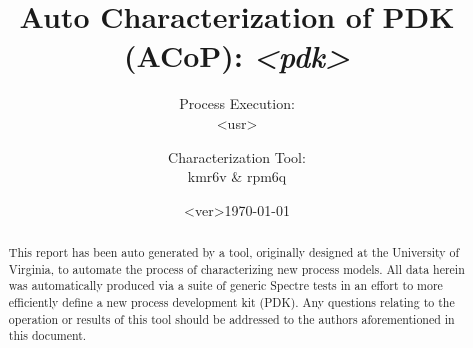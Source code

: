 \documentclass[letterpaper]{article}
\title{Auto Characterization of PDK (ACoP): \emph{<pdk>}}
\author{Process Execution: \\<usr> \and Characterization Tool: \\kmr6v \& rpm6q}
\date{<ver>\today}
\begin{document}


\maketitle
\begin{abstract}
This report has been auto generated by a tool, originally designed at the University of Virginia, to automate the process of characterizing new process models. All data herein was automatically produced via a suite of generic Spectre tests in an effort to more efficiently define a new process development kit (PDK). Any questions relating to the operation or results of this tool should be addressed to the authors aforementioned in this document.
\end{abstract}

\newpage
\listoffigures 
\newpage
\end{document}
